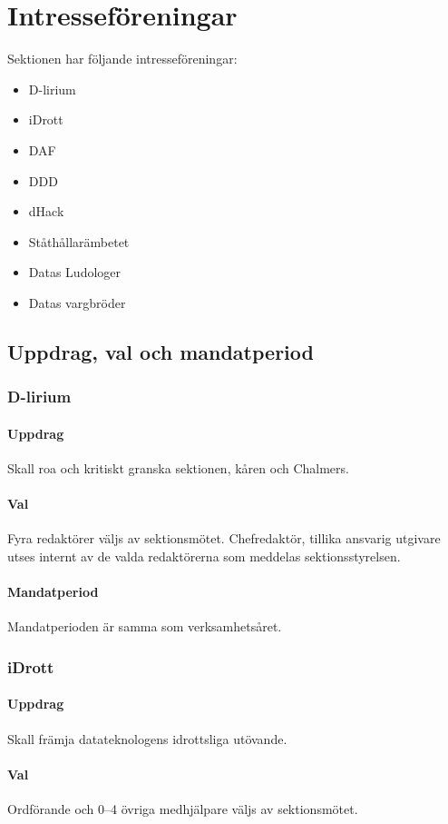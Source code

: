 \section{Intresseföreningar}
Sektionen har följande intresseföreningar:
\begin{itemize}
  \item D-lirium 
  \item iDrott 
  \item DAF 
  \item DDD
  \item dHack
  \item Ståthållarämbetet
  \item Datas Ludologer 
  \item Datas vargbröder
\end{itemize}
\subsection{Uppdrag, val och mandatperiod}
\subsubsection{D-lirium}
\paragraph{Uppdrag}
Skall roa och kritiskt granska sektionen, kåren och Chalmers. 
\paragraph{Val}
Fyra redaktörer väljs av sektionsmötet. Chefredaktör, tillika ansvarig utgivare utses internt av de valda redaktörerna som meddelas sektionsstyrelsen. 
\paragraph{Mandatperiod}
Mandatperioden är samma som verksamhetsåret. 
\subsubsection{iDrott}
\paragraph{Uppdrag}
Skall främja datateknologens idrottsliga utövande. 
\paragraph{Val}
Ordförande och 0--4 övriga medhjälpare väljs av sektionsmötet. 
